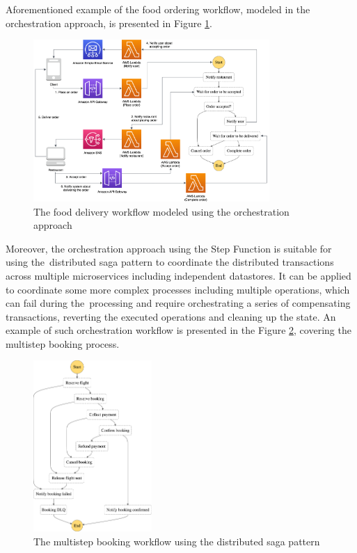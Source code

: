 Aforementioned example of the food ordering workflow, modeled in the orchestration approach, is presented in Figure \ref{fig:orchestration-diagram}.

\begin{figure}[H]
   \centering
   \includegraphics[width=0.8\textwidth]{assets/04-serverless-for-web-apps/orchestration.png}
   \caption{The food delivery workflow modeled using the orchestration approach}
   \label{fig:orchestration-diagram}
\end{figure}

Moreover, the orchestration approach using the Step Function is suitable for using the~distributed saga pattern \cite{SagaPattern} to coordinate the distributed transactions across multiple microservices including independent datastores.
It can be applied to coordinate some more complex processes including multiple operations, which can fail during the~processing and require orchestrating a series of compensating transactions, reverting the executed operations and cleaning up the state.
An example of such orchestration workflow is presented in the Figure \ref{fig:saga-orchestration-diagram}, covering the multistep booking process.

\begin{figure}[H]
   \centering
   \includegraphics[width=0.4\textwidth]{assets/04-serverless-for-web-apps/saga.png}
   \caption{The multistep booking workflow using the distributed saga pattern}
   \label{fig:saga-orchestration-diagram}
\end{figure}

